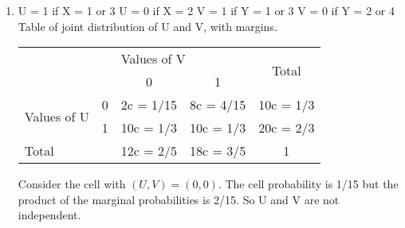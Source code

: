 \documentclass[a4paper,12pt]{article}
\begin{document}
\begin{enumerate}
\item  U = 1 if X = 1 or 3 U = 0 if X = 2
V = 1 if Y = 1 or 3 V = 0 if Y = 2 or 4
Table of joint distribution of U and V, with margins.
\begin{center}
\begin{tabular}{cc|c|c|c|}
\cline{3-5}
                                                   &   & \multicolumn{2}{l|}{Values of V} & \multirow{2}{*}{Total} \\ \cline{3-4}
                                                   &   & 0               & 1              &                        \\ \hline
\multicolumn{1}{|l|}{\multirow{2}{*}{Values of U}} & 0 & 2c  =  1/15     & 8c  =  4/15    & 10c  =  1/3            \\ \cline{2-5} 
\multicolumn{1}{|l|}{}                             & 1 & 10c = 1/3       & 10c = 1/3      & 20c = 2/3              \\ \hline
\multicolumn{2}{|l|}{Total}                            & 12c = 2/5       & 18c = 3/5      & 1                      \\ \hline
\end{tabular}
\end{center}


Consider the cell with $(U, V) = (0, 0)$. The cell probability is 1/15 but the product of the marginal probabilities is 2/15. So U and V are not independent.
\end{enumerate}
\end{document}
